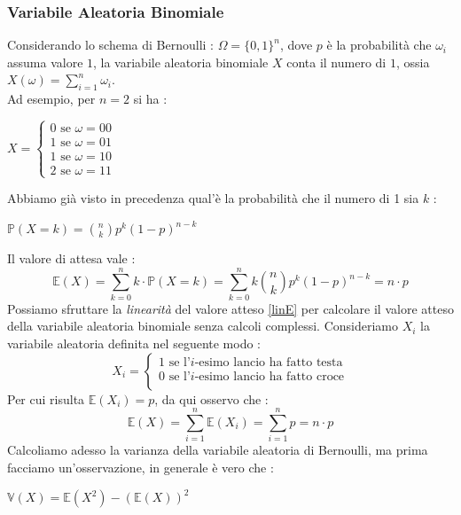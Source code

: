 \documentclass[12pt, letterpaper]{article}
\newcommand{\E}{{\mathbb E}}
\newcommand{\V}{{\mathbb V}}
\newcommand{\Prob}{{\mathbb P}}
\begin{document}
\subsubsection{Variabile Aleatoria Binomiale}\label{valBin}
Considerando lo schema di Bernoulli : \(\Omega=\{0,1\}^n\), dove \(p\) è la probabilità che \(\omega_i\) assuma 
valore \(1\), la variabile aleatoria binomiale \(X\) conta 
il numero di \(1\), ossia \(X(\omega)=\displaystyle \sum_{i=1}^n\omega_i\). \\Ad esempio, per \(n=2\) si ha : 
\begin{center}
    \(
    X=\begin{cases}
        0\text{ se }\omega=00\\
        1\text{ se  }\omega=01\\
        1\text{  se }\omega=10\\
        2\text{ se  }\omega=11
    \end{cases}    
    \)
\end{center}
Abbiamo già visto in precedenza qual'è la probabilità che il numero di 1 sia \(k\) :\begin{center} 
    \(\Prob(X=k)=\displaystyle \binom{n}{k}p^k(1-p)^{n-k}\)\end{center}
    Il valore di attesa vale :
    \begin{equation}
        \mathbb{E}(X)=\sum_{k=0}^nk\cdot \Prob(X=k)=\sum_{k=0}^nk\binom{n}{k}p^k(1-p)^{n-k}=n\cdot p
    \end{equation}
Possiamo sfruttare la \textit{linearità} del valore atteso \ref{linE} per calcolare il valore atteso 
della variabile aleatoria binomiale senza calcoli complessi.
Consideriamo \(X_i\) la variabile aleatoria definita nel seguente modo : \begin{equation}
    X_i=\begin{cases}
        1 \text{ se l'}i\text{-esimo lancio ha fatto testa}\\
        0 \text{ se l'}i\text{-esimo lancio ha fatto croce}\\
    \end{cases}
\end{equation}
Per cui risulta \(\E(X_i)=p\), da qui osservo che :\begin{equation}
    \E(X)=\sum_{i=1}^n\E(X_i)=\sum_{i=1}^np=n\cdot p
\end{equation}
Calcoliamo adesso la varianza della variabile aleatoria di Bernoulli, ma prima facciamo un'osservazione, in generale
è vero che  :\begin{center}
    \(\V(X)=\E(X^2)-(\E(X))^2\)
\end{center}
\end{document}
